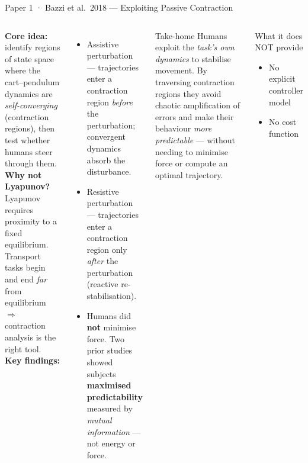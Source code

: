 \documentclass[aspectratio=169,10pt]{beamer}
\begin{document}
\begin{frame}{Paper 1 · Bazzi et al.\ 2018 --- Exploiting Passive Contraction}
\begin{columns}[T]
  \textbf{Core idea:} identify regions of state space where the cart--pendulum
  dynamics are \emph{self-converging} (contraction regions), then test whether
  humans steer through them.\\[5pt]
  \textbf{Why not Lyapunov?}  Lyapunov requires proximity to a fixed
  equilibrium.  Transport tasks begin and end \emph{far} from equilibrium
  $\Rightarrow$ contraction analysis is the right tool.\\[5pt]
  \textbf{Key findings:}
  \begin{itemize}\setlength\itemsep{3pt}
    \item \textcolor{mgreen}{Assistive} perturbation --- trajectories enter
          a contraction region \emph{before} the perturbation; convergent
          dynamics absorb the disturbance.
    \item \textcolor{morange}{Resistive} perturbation --- trajectories enter
          a contraction region only \emph{after} the perturbation (reactive
          re-stabilisation).
    \item Humans did \textbf{not} minimise force.  Two prior studies showed
          subjects \textbf{maximised predictability} measured by
          \emph{mutual information} --- not energy or force.
  \end{itemize}

  \begin{alertblock}{Take-home}
    Humans exploit the \emph{task's own dynamics} to stabilise movement.
    By traversing contraction regions they avoid chaotic amplification of
    errors and make their behaviour \emph{more predictable} --- without
    needing to minimise force or compute an optimal trajectory.
  \end{alertblock}
  \vspace{5pt}
  \begin{block}{What it does NOT provide}
    \begin{itemize}\setlength\itemsep{2pt}
      \item No explicit controller model
      \item No cost function
    \end{itemize}
  \end{block}
\end{columns}
\end{frame}
\end{document}
